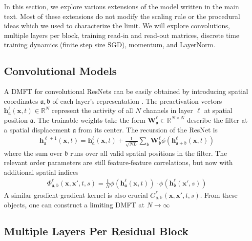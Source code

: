 \documentclass{article} %
\def\h{\bm h}
\def\x{\bm x}
\def\W{\bm W}
\begin{document}
In this section, we explore various extensions of the model written in the main text. Most of these extensions do not modify the scaling rule or the procedural ideas which we used to characterize the limit. We will explore convolutions, multiple layers per block, training read-in and read-out matrices, discrete time training dynamics (finite step size SGD), momentum, and LayerNorm.  

\subsection{Convolutional Models}

A DMFT for convolutional ResNets can be easily obtained by introducing spatial coordinates $\mathfrak a, \mathfrak b$ of each layer's representation \citep{bordelon2022self}. The preactivation vectors $\h^\ell_{\mathfrak a}(\x,t) \in \mathbb{R}^{N}$ represent the activity of all $N$ channels in layer $\ell$ at spatial position $\mathfrak a$. The trainable weights take the form $\W^{\ell}_{\mathfrak a} \in \mathbb{R}^{N \times N}$ describe the filter at a spatial displacement $\mathfrak a$ from its center. The recursion of the ResNet is
\begin{align}
    \bm h^{\ell+1}_{\mathfrak a}(\x,t) = \bm h^{\ell}_{\mathfrak a}(\x,t) + \frac{1}{\sqrt{N L}} \sum_{\mathfrak b} \W^{\ell}_{\mathfrak b} \phi(\h^{\ell}_{\mathfrak a + \mathfrak b}(\x,t))
\end{align}
where the sum over $\mathfrak b$ runs over all valid spatial positions in the filter. The relevant order parameters are still feature-feature correlations, but now with additional spatial indices
\begin{align}
    \Phi^{\ell}_{\mathfrak a,\mathfrak b}(\x,\x',t,s) = \frac{1}{N} \phi(\h^{\ell}_{\mathfrak a}(\x,t)) \cdot \phi(\h^{\ell}_{\mathfrak b}(\x',s))  
\end{align}
A similar gradient-gradient kernel is also crucial $G^{\ell}_{\mathfrak a,\mathfrak b}(\x,\x',t,s)$. From these objects, one can construct a limiting DMFT at $N \to \infty$ 

\subsection{Multiple Layers Per Residual Block}\label{app:multi_layer_per_block}
\end{document}
